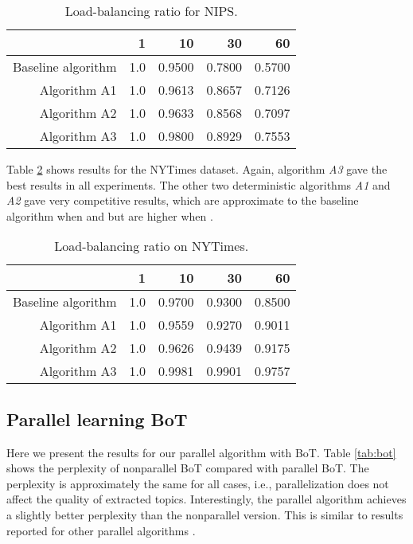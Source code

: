 \documentclass[10pt,conference]{IEEEtran}
\begin{document}
\begin{table}[htbp]
  \centering
  \caption{Load-balancing ratio for NIPS.}
    \begin{tabular}{r|r|r|r|r}
    \hline
     & \textbf{1} & \textbf{10} & \textbf{30} & \textbf{60} \\
    \hline
    Baseline algorithm & 1.0     & 0.9500 & 0.7800 & 0.5700 \\
    Algorithm A1 & 1.0     & 0.9613 & 0.8657 & 0.7126 \\
    Algorithm A2 & 1.0     & 0.9633 & 0.8568 & 0.7097 \\
    Algorithm A3 & 1.0     & 0.9800 & 0.8929 & 0.7553 \\
    \hline
    \end{tabular}\label{tab:nips}\end{table}
Table \ref{tab:nyt} shows results for the NYTimes dataset. Again, algorithm \textit{A3} gave the best results in all experiments. The other two deterministic algorithms \textit{A1} and \textit{A2} gave very competitive results, which are approximate to the baseline algorithm when  and  but are higher when .

\begin{table}[htbp]
  \centering
  \caption{Load-balancing ratio on NYTimes.}
    \begin{tabular}{r|r|r|r|r}
    \hline
	 & \textbf{1} & \textbf{10} & \textbf{30} & \textbf{60} \\
    \hline
    Baseline algorithm & 1.0     & 0.9700 & 0.9300 & 0.8500 \\
    Algorithm A1 & 1.0     & 0.9559 & 0.9270 & 0.9011 \\
    Algorithm A2 & 1.0     & 0.9626 & 0.9439 & 0.9175 \\
    Algorithm A3 & 1.0     & 0.9981 & 0.9901 & 0.9757 \\
    \hline
    \end{tabular}\label{tab:nyt}\end{table}
\subsection{Parallel learning BoT}
Here we present the results for our parallel algorithm with BoT. Table \ref{tab:bot} shows the perplexity of nonparallel BoT compared with parallel BoT. The perplexity is approximately the same for all cases, i.e., parallelization does not affect the quality of extracted topics. Interestingly, the parallel algorithm achieves a slightly better perplexity than the nonparallel version. This is similar to results reported for other parallel algorithms \cite{newman2007distributed,ihler2012understanding}.
\end{document}

